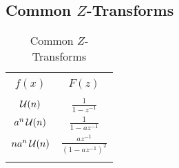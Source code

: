 \subsection{Common \texorpdfstring{$Z$-Transforms}{Z-Transforms}}\label{subsubsec:Common Z-Transforms}
\begin{table}[h!]
  \centering
  \begin{tabular}{cc}
    \toprule \\
    $f(x)$ & $F(z)$ \\
    \midrule \\
    $\operatorname{\mathcal{U}}(n)$ & $\frac{1}{1-z^{-1}}$ \\
    $a^{n}\operatorname{\mathcal{U}}(n)$ & $\frac{1}{1-az^{-1}}$ \\
    $na^{n}\operatorname{\mathcal{U}}(n)$ & $\frac{az^{-1}}{{\left( 1-az^{-1} \right)}^{2}}$ \\
    \bottomrule \\
  \end{tabular}
  \caption{Common $Z$-Transforms}
  \label{tab:Common Z-Transforms}
\end{table}

